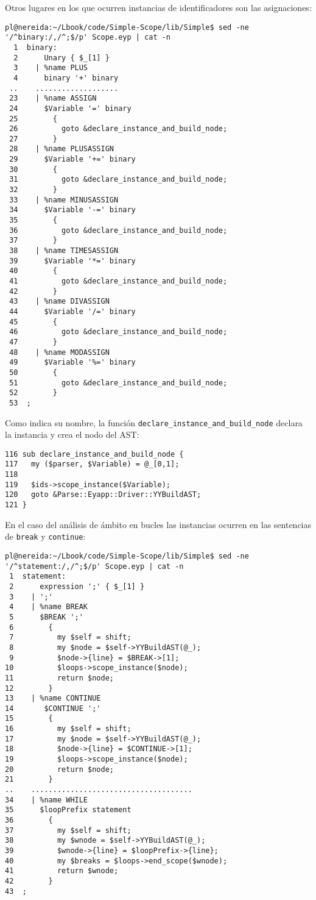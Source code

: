 Otros lugares en los que ocurren instancias de identificadores son las 
asignaciones:
\begin{verbatim}
pl@nereida:~/Lbook/code/Simple-Scope/lib/Simple$ sed -ne '/^binary:/,/^;$/p' Scope.eyp | cat -n
  1  binary:
  2      Unary { $_[1] }
  3    | %name PLUS
  4      binary '+' binary
 ..    ...................
 23    | %name ASSIGN
 24      $Variable '=' binary
 25        {
 26          goto &declare_instance_and_build_node;
 27        }
 28    | %name PLUSASSIGN
 29      $Variable '+=' binary
 30        {
 31          goto &declare_instance_and_build_node;
 32        }
 33    | %name MINUSASSIGN
 34      $Variable '-=' binary
 35        {
 36          goto &declare_instance_and_build_node;
 37        }
 38    | %name TIMESASSIGN
 39      $Variable '*=' binary
 40        {
 41          goto &declare_instance_and_build_node;
 42        }
 43    | %name DIVASSIGN
 44      $Variable '/=' binary
 45        {
 46          goto &declare_instance_and_build_node;
 47        }
 48    | %name MODASSIGN
 49      $Variable '%=' binary
 50        {
 51          goto &declare_instance_and_build_node;
 52        }
 53  ;
\end{verbatim}
Como indica su nombre, la función \verb|declare_instance_and_build_node|
declara la instancia y crea el nodo del AST:
\begin{verbatim}
116 sub declare_instance_and_build_node {
117   my ($parser, $Variable) = @_[0,1];
118
119   $ids->scope_instance($Variable);
120   goto &Parse::Eyapp::Driver::YYBuildAST;
121 }
\end{verbatim}

En el caso del análisis de ámbito en bucles las instancias ocurren en las
sentencias de \verb|break| y \verb|continue|:

\begin{verbatim}
pl@nereida:~/Lbook/code/Simple-Scope/lib/Simple$ sed -ne '/^statement:/,/^;$/p' Scope.eyp | cat -n
 1  statement:
 2      expression ';' { $_[1] }
 3    | ';'
 4    | %name BREAK
 5      $BREAK ';'
 6        {
 7          my $self = shift;
 8          my $node = $self->YYBuildAST(@_);
 9          $node->{line} = $BREAK->[1];
10          $loops->scope_instance($node);
11          return $node;
12        }
13    | %name CONTINUE
14       $CONTINUE ';'
15        {
16          my $self = shift;
17          my $node = $self->YYBuildAST(@_);
18          $node->{line} = $CONTINUE->[1];
19          $loops->scope_instance($node);
20          return $node;
21        }
..    .....................................
34    | %name WHILE
35      $loopPrefix statement
36        {
37          my $self = shift;
38          my $wnode = $self->YYBuildAST(@_);
39          $wnode->{line} = $loopPrefix->{line};
40          my $breaks = $loops->end_scope($wnode);
41          return $wnode;
42        }
43  ;
\end{verbatim}

